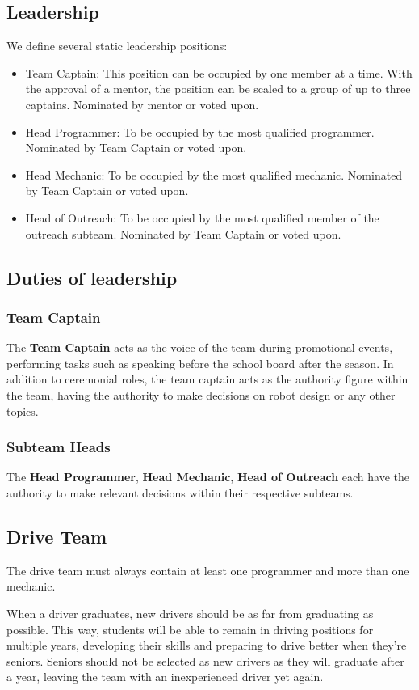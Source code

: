 \documentclass{proc}
\begin{document}
\subsection{Leadership}
We define several static leadership positions:
\begin{itemize}
  \item{Team Captain: This position can be occupied by one member at a time. With the approval of a mentor, the position can be scaled to a group of up to three captains. Nominated by mentor or voted upon.}
  \item{Head Programmer: To be occupied by the most qualified programmer. Nominated by Team Captain or voted upon.}
  \item{Head Mechanic: To be occupied by the most qualified mechanic. Nominated by Team Captain or voted upon.}
  \item{Head of Outreach: To be occupied by the most qualified member of the outreach subteam. Nominated by Team Captain or voted upon.}
\end{itemize}

\subsection{Duties of leadership}
\subsubsection{Team Captain}
The \textbf{Team Captain} acts as the voice of the team during promotional events, performing tasks such as speaking before the school board after the season. In addition to ceremonial roles, the team captain acts as the authority figure within the team, having the authority to make decisions on robot design or any other topics.

\subsubsection{Subteam Heads}
The \textbf{Head Programmer}, \textbf{Head Mechanic}, \textbf{Head of Outreach} each have the authority to make relevant decisions within their respective subteams.

\subsection{Drive Team}
The drive team must always contain at least one programmer and more than one mechanic.

When a driver graduates, new drivers should be as far from graduating as possible. This way, students will be able to remain in driving positions for multiple years, developing their skills and preparing to drive better when they're seniors. Seniors should not be selected as new drivers as they will graduate after a year, leaving the team with an inexperienced driver yet again.
\end{document}
